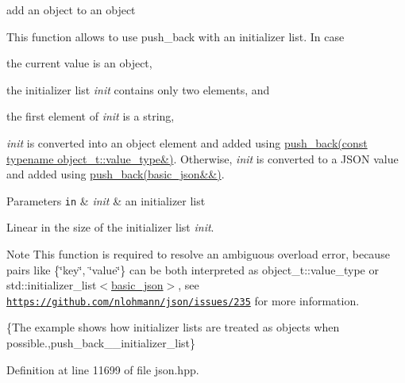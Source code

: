 add an object to an object 

This function allows to use {\ttfamily push\+\_\+back} with an initializer list. In case


\begin{DoxyEnumerate}
\item the current value is an object,
\item the initializer list {\itshape init} contains only two elements, and
\item the first element of {\itshape init} is a string,
\end{DoxyEnumerate}

{\itshape init} is converted into an object element and added using \hyperlink{classnlohmann_1_1basic__json_ae11a3a51782c058fff2f6550cdfb9b3c}{push\+\_\+back(const typename object\+\_\+t\+::value\+\_\+type\&)}. Otherwise, {\itshape init} is converted to a J\+S\+ON value and added using \hyperlink{classnlohmann_1_1basic__json_ac8e523ddc8c2dd7e5d2daf0d49a9c0d7}{push\+\_\+back(basic\+\_\+json\&\&)}.


\begin{DoxyParams}[1]{Parameters}
\mbox{\tt in}  & {\em init} & an initializer list\\
\hline
\end{DoxyParams}
Linear in the size of the initializer list {\itshape init}.

\begin{DoxyNote}{Note}
This function is required to resolve an ambiguous overload error, because pairs like {\ttfamily \{\char`\"{}key\char`\"{}, \char`\"{}value\char`\"{}\}} can be both interpreted as {\ttfamily object\+\_\+t\+::value\+\_\+type} or {\ttfamily std\+::initializer\+\_\+list$<$\hyperlink{classnlohmann_1_1basic__json}{basic\+\_\+json}$>$}, see \href{https://github.com/nlohmann/json/issues/235}{\tt https\+://github.\+com/nlohmann/json/issues/235} for more information.
\end{DoxyNote}
\{The example shows how initializer lists are treated as objects when possible.,push\+\_\+back\+\_\+\+\_\+initializer\+\_\+list\} 

Definition at line 11699 of file json.\+hpp.

